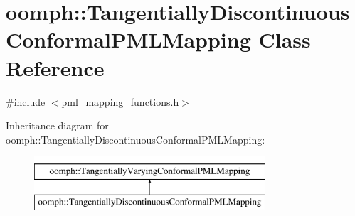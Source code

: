 \hypertarget{classoomph_1_1TangentiallyDiscontinuousConformalPMLMapping}{}\section{oomph\+:\+:Tangentially\+Discontinuous\+Conformal\+P\+M\+L\+Mapping Class Reference}
\label{classoomph_1_1TangentiallyDiscontinuousConformalPMLMapping}


{\ttfamily \#include $<$pml\+\_\+mapping\+\_\+functions.\+h$>$}

Inheritance diagram for oomph\+:\+:Tangentially\+Discontinuous\+Conformal\+P\+M\+L\+Mapping\+:\begin{figure}[H]
\begin{center}
\leavevmode
\includegraphics[height=2.000000cm]{classoomph_1_1TangentiallyDiscontinuousConformalPMLMapping}
\end{center}
\end{figure}
